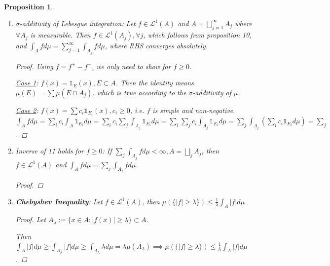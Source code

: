 \documentclass[12pt]{article}
\theoremstyle{blueplain}
\newtheorem{proposition}[theorem]{Proposition}
\theoremstyle{bluedef}
\theoremstyle{blueremark}
\numberwithin{equation}{section}
\begin{document}
\begin{proposition}
\begin{enumerate}
\begin{proof}
            Clearly, $f_n \in \mathcal{L}^1(E)$ since its series $\sum c_j \mu(E_j)$ on $E$ is majorated by that on $A$, and $\int_E f_n d\mu \leq \int_A f_n d\mu$ (Note that $f_n \geq 0$.).

            $\implies f \in \mathcal{L}^1(E)$ and passing $\int_E f_n d\mu \leq \int_A f_n d\mu$ to limit: $\int_E f d\mu \leq \int_A f_n d\mu$.
          \end{proof}

    \item $\sigma$-additivity of Lebesgue integration: Let $f \in \mathcal{L}^1(A)$ and $A = \bigsqcup_{j=1}^{\infty} A_j$ where $\forall A_j$ is measurable. Then $f \in \mathcal{L}^1(A_j), \forall j$, which follows from proposition 10, and $\int_A f d\mu = \sum_{j=1}^{\infty} \int_{A_j} f d\mu$, where RHS converges absolutely.
          \begin{proof}
            Using $f = f^+ - f^-$, we only need to show for $f \geq 0$.

            \underline{Case 1}: $f(x) = \mathds{1}_{E} (x), E \subset A$. Then the identity means $\mu(E) = \sum \mu(E \cap A_j)$, which is true according to the $\sigma$-additivity of $\mu$.

            \underline{Case 2}: $f(x) = \sum c_i \mathds{1}_{E_i} (x), c_i \geq 0$, i.e. $f$ is simple and non-negative. $\int_A f d\mu = \sum_i c_i \int_A \mathds{1}_{E_i} d\mu = \sum_i c_i \sum_j \int_{A_j} \mathds{1}_{E_i} d\mu = \sum_i \sum_j c_i \int_{A_j} \mathds{1}_{E_i} d\mu = \sum_j \int_{A_j} (\sum_i c_i \mathds{1}_{E_i} d\mu) = \sum_j $.

          \end{proof}

    \item Inverse of 11 holds for $f \geq 0$: If $\sum_j \int_{A_j} f d\mu < \infty, A = \bigsqcup_j A_j$, then $f \in \mathcal{L}^1(A)$ and $\int_A f d\mu = \sum_j \int_{A_j} f d\mu$.
          \begin{proof}

          \end{proof}

    \item \textbf{Chebyshev Inequality}: Let $f \in \mathcal{L}^1(A)$, then $\mu(\{|f| \geq \lambda\}) \leq \frac{1}{\lambda} \int_A |f| d\mu$.

          \begin{proof}
            Let $A_{\lambda} := \{x \in A: |f(x)| \geq \lambda\} \subset A$.

            Then $\int_A |f| d\mu \geq \int_{A_{\lambda}} |f| d\mu \geq \int_{A_{\lambda}} \lambda d\mu = \lambda \mu(A_{\lambda}) \implies \mu(\{|f| \geq \lambda\}) \leq \frac{1}{\lambda} \int_A |f| d\mu$.
          \end{proof}


\end{enumerate}
\end{proposition}
\end{document}
